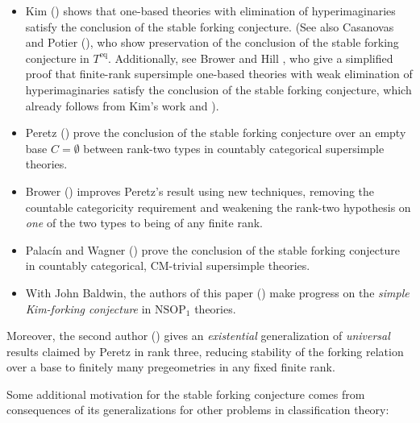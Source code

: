 \documentclass{amsart}
\theoremstyle{definition}
\theoremstyle{remark}
\numberwithin{equation}{section}
\begin{document}
\begin{itemize}
    \item Kim (\cite{Kim01}) shows that one-based theories with elimination of hyperimaginaries satisfy the conclusion of the stable forking conjecture. (See also Casanovas and Potier (\cite{casanovaspotier2018}), who show preservation of the conclusion of the stable forking conjecture in $T^{\mathrm{eq}}$. Additionally, see Brower and Hill \cite{BrowerHillHyperimaginaries}, who give a simplified proof that finite-rank supersimple one-based theories with weak elimination of hyperimaginaries satisfy the conclusion of the stable forking conjecture, which already follows from Kim's work and \cite{BuechlerPillayWagner2001}).

    \item Peretz (\cite{Per06}) prove the conclusion of the stable forking conjecture over an empty base $C = \emptyset$ between rank-two types in countably categorical supersimple theories.

    \item Brower (\cite{Brower2012}) improves Peretz's result using new techniques, removing the countable categoricity requirement and weakening the rank-two hypothesis on \textit{one} of the two types to being of any finite rank.

    \item Palacín and Wagner (\cite{PW13}) prove the conclusion of the stable forking conjecture in countably categorical, $\mathrm{CM}$-trivial supersimple theories.
    \item With John Baldwin, the authors of this paper (\cite{KoponenConjecture}) make progress on the \textit{simple Kim-forking conjecture} in $\mathrm{NSOP}_{1}$ theories.
\end{itemize}

Moreover, the second author (\cite{MutchnikReducing}) gives an \textit{existential} generalization of \textit{universal} results claimed by Peretz in rank three, reducing stability of the forking relation over a base to finitely many pregeometries in any fixed finite rank. 

Some additional motivation for the stable forking conjecture comes from consequences of its generalizations for other problems in classification theory:
\end{document}
